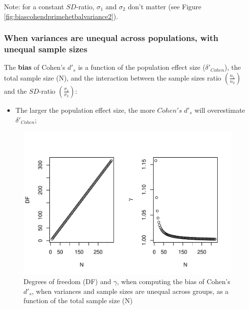 \documentclass[
  man]{apa6}
\providecommand{\tightlist}{%
  \setlength{\itemsep}{0pt}\setlength{\parskip}{0pt}}
\begin{document}
Note: for a constant \(SD\)-ratio, \(\sigma_1\) and \(\sigma_2\) don't matter (see Figure \ref{fig:biascohendprimehetbalvariance2}).

\hypertarget{when-variances-are-unequal-across-populations-with-unequal-sample-sizes}{%
\subsubsection{When variances are unequal across populations, with unequal sample sizes}\label{when-variances-are-unequal-across-populations-with-unequal-sample-sizes}}

The \textbf{bias} of Cohen's \(d'_s\) is a function of the population effect size (\(\delta'_{Cohen}\)), the total sample size (N), and the interaction between the sample sizes ratio \(\left(\frac{n_1}{n_2} \right)\) and the \(SD\)-ratio \(\left(\frac{\sigma_1}{\sigma_2} \right)\):

\begin{itemize}
\tightlist
\item
  The larger the population effect size, the more \(Cohen's \; d'_s\) will overestimate \(\delta'_{Cohen}\);
\end{itemize}

\begin{figure}
\centering
\includegraphics{Theoretical-Bias-of-all-estimators-as-a-function-of-population-parameters_files/figure-latex/biascohendprimehetunbalNsize2-1.pdf}
\caption{\label{fig:biascohendprimehetunbalNsize2}Degrees of freedom (DF) and \(\gamma\), when computing the bias of Cohen's \(d'_s\), when variances and sample sizes are unequal across groups, as a function of the total sample size (N)}
\end{figure}
\end{document}
